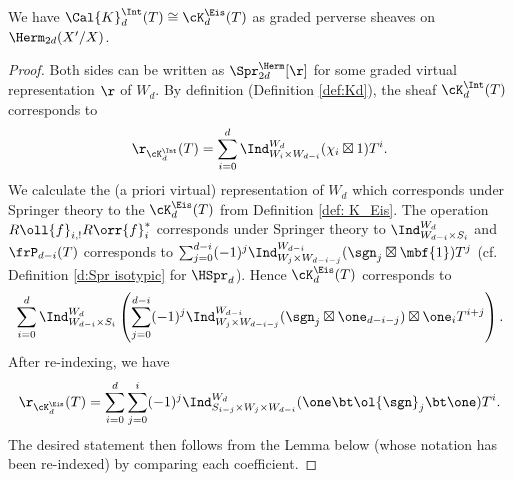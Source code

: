 \begin{prop}
\notready
We have $ \Cal{K}^{\Int}_{d}(T) \cong \cK_{d}^{\Eis}(T)$ as graded perverse sheaves  on $\Herm_{2d}(X'/X)$.
\end{prop}
\begin{proof} Both sides can be written as $\Spr^{\Herm}_{2d}[\r]$ for some graded virtual representation $\r$ of $W_{d}$. By definition (Definition \ref{def:Kd}), the sheaf $\cK^{\Int}_{d}(T)$ corresponds to
\[
\r_{\cK_{d}^{\Int}}(T)=\sum_{i=0}^{d} \Ind_{W_i \times W_{d-i}}^{W_d} (\chi_i \boxtimes 1) T^{i}.
\]
We calculate the (a priori virtual) representation of $W_d$ which corresponds under Springer theory to the $\cK_{d}^{\Eis}(T)$ from Definition \ref{def: K_Eis}. The operation $R\oll{f}_{i,!}R\orr{f}^{*}_{i}$ corresponds under Springer theory to $\Ind_{W_{d-i} \times S_i}^{W_d}$ and $\frP_{d-i}(T)$ corresponds to $\sum_{j=0}^{d-i} (-1)^j \Ind_{W_j \times W_{d-i-j}}^{W_{d-i}} (\sgn_j \boxtimes \mbf{1}) T^j$ (cf. Definition \ref{d:Spr isotypic}  for $\HSpr_{d}$). Hence $
\cK_{d}^{\Eis}(T)$ corresponds to
\[
\sum_{i=0}^d \Ind_{W_{d-i} \times S_i}^{W_d} \left( \sum_{j=0}^{d-i}(-1)^j  \Ind_{W_j \times W_{d-i-j}}^{W_{d-i}}(\sgn_j \boxtimes \one_{d-i-j}) \boxtimes \one_i T^{i+j} \right) .
\]
After re-indexing, we have
\[
\r_{\cK_{d}^{\Eis}}(T)=\sum_{i=0}^{d} \sum_{j=0}^{i}(-1)^j\Ind_{S_{i-j} \times W_j \times W_{d-i}}^{W_d} (\one \bt \ol{\sgn}_{j} \bt \one ) T^{i}.
\]
The desired statement then follows from the Lemma below (whose notation has been re-indexed) by comparing each coefficient.
\end{proof}


